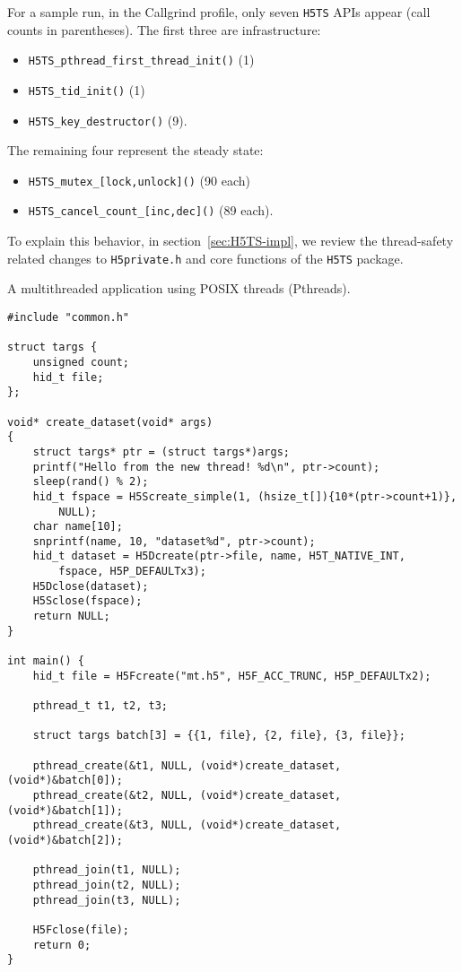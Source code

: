 For a sample run, in the Callgrind profile, only seven \texttt{H5TS} APIs appear (call counts in parentheses). The first three are infrastructure:
\begin{itemize}
    \item \texttt{H5TS\_pthread\_first\_thread\_init()} (1)
    \item \texttt{H5TS\_tid\_init()} (1)
    \item \texttt{H5TS\_key\_destructor()} (9).
\end{itemize}
The remaining four represent the steady state:
\begin{itemize}
    \item \texttt{H5TS\_mutex\_[lock,unlock]()} (90 each)
    \item \texttt{H5TS\_cancel\_count\_[inc,dec]()} (89 each).
\end{itemize}

To explain this behavior, in section~\ref{sec:H5TS-impl}, we review the thread-safety related changes to \texttt{H5private.h} and core functions of the \texttt{H5TS} package.

\begin{listing}
\centering
\caption{A multithreaded application using POSIX threads (Pthreads).}
\label{lst:pthreads-ex-parallel}
\begin{verbatim}
#include "common.h"

struct targs {
    unsigned count;
    hid_t file;
};

void* create_dataset(void* args)
{
    struct targs* ptr = (struct targs*)args;
    printf("Hello from the new thread! %d\n", ptr->count);
    sleep(rand() % 2);
    hid_t fspace = H5Screate_simple(1, (hsize_t[]){10*(ptr->count+1)},
        NULL);
    char name[10];
    snprintf(name, 10, "dataset%d", ptr->count);
    hid_t dataset = H5Dcreate(ptr->file, name, H5T_NATIVE_INT,
        fspace, H5P_DEFAULTx3);
    H5Dclose(dataset);
    H5Sclose(fspace);
    return NULL;
}

int main() {
    hid_t file = H5Fcreate("mt.h5", H5F_ACC_TRUNC, H5P_DEFAULTx2);

    pthread_t t1, t2, t3;

    struct targs batch[3] = {{1, file}, {2, file}, {3, file}};

    pthread_create(&t1, NULL, (void*)create_dataset, (void*)&batch[0]);
    pthread_create(&t2, NULL, (void*)create_dataset, (void*)&batch[1]);
    pthread_create(&t3, NULL, (void*)create_dataset, (void*)&batch[2]);

    pthread_join(t1, NULL);
    pthread_join(t2, NULL);
    pthread_join(t3, NULL);

    H5Fclose(file);
    return 0;
}
\end{verbatim}
\end{listing}

